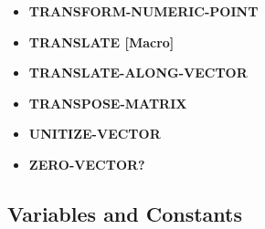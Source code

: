 \documentclass [11pt]{book}
\begin{document}
\begin{itemize}
\item {}
\textbf{TRANSFORM-NUMERIC-POINT}





\item {}
\textbf{TRANSLATE [Macro]}





\item {}
\textbf{TRANSLATE-ALONG-VECTOR}





\item {}
\textbf{TRANSPOSE-MATRIX}





\item {}
\textbf{UNITIZE-VECTOR}





\item {}
\textbf{ZERO-VECTOR?}





\end{itemize}



\subsection{Variables and Constants}

\label{subsec:variablesandconstants}
\end{document}
